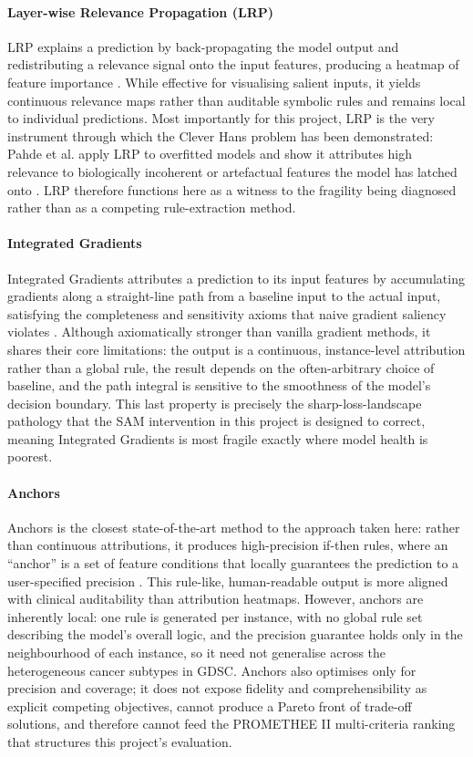 {\paragraph{Layer-wise Relevance Propagation (LRP)}
LRP explains a prediction by back-propagating the model output and redistributing a relevance signal
onto the input features, producing a heatmap of feature importance \cite{Bach2015,Samek2017}. While
effective for visualising salient inputs, it yields continuous relevance maps rather than auditable
symbolic rules and remains local to individual predictions. Most importantly for this project, LRP
is the very instrument through which the Clever Hans problem has been demonstrated: Pahde et al.
apply LRP to overfitted models and show it attributes high relevance to biologically incoherent or
artefactual features the model has latched onto \cite{Pahde2023}. LRP therefore functions here as a
witness to the fragility being diagnosed rather than as a competing rule-extraction method.

\paragraph{Integrated Gradients}
Integrated Gradients attributes a prediction to its input features by accumulating gradients along a
straight-line path from a baseline input to the actual input, satisfying the completeness and
sensitivity axioms that naive gradient saliency violates \cite{Sundararajan2017}. Although
axiomatically stronger than vanilla gradient methods, it shares their core limitations: the output
is a continuous, instance-level attribution rather than a global rule, the result depends on the
often-arbitrary choice of baseline, and the path integral is sensitive to the smoothness of the
model's decision boundary. This last property is precisely the sharp-loss-landscape pathology that
the SAM intervention in this project is designed to correct, meaning Integrated Gradients is most
fragile exactly where model health is poorest.

\paragraph{Anchors}
Anchors is the closest state-of-the-art method to the approach taken here: rather than continuous
attributions, it produces high-precision if-then rules, where an ``anchor'' is a set of feature
conditions that locally guarantees the prediction to a user-specified precision \cite{Ribeiro2018}.
This rule-like, human-readable output is more aligned with clinical auditability than attribution
heatmaps. However, anchors are inherently local: one rule is generated per instance, with no global
rule set describing the model's overall logic, and the precision guarantee holds only in the
neighbourhood of each instance, so it need not generalise across the heterogeneous cancer subtypes
in GDSC. Anchors also optimises only for precision and coverage; it does not expose fidelity and
comprehensibility as explicit competing objectives, cannot produce a Pareto front of trade-off
solutions, and therefore cannot feed the PROMETHEE II multi-criteria ranking that structures this
project's evaluation.

}
